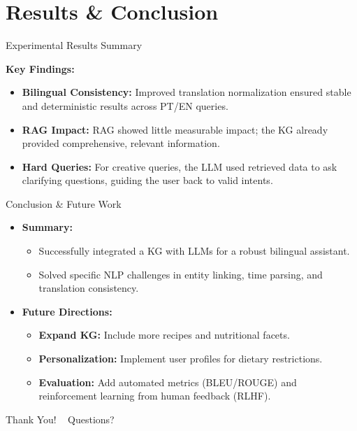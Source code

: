 \documentclass[t, 10pt, handout, aspectratio=169]{beamer}
\begin{document}
\section{Results \& Conclusion}
\begin{frame}{Experimental Results Summary}

  \vspace{1em}
  \textbf{Key Findings:}
  \begin{itemize}
    \item \textbf{Bilingual Consistency:} Improved translation normalization ensured stable and deterministic results across PT/EN queries.
    \item \textbf{RAG Impact:} RAG showed little measurable impact; the KG already provided comprehensive, relevant information.
    \item \textbf{Hard Queries:} For creative queries, the LLM used retrieved data to ask clarifying questions, guiding the user back to valid intents.
  \end{itemize}
\end{frame}

\begin{frame}{Conclusion \& Future Work}
  \begin{itemize}
    \item \textbf{Summary:}
      \begin{itemize}
        \item Successfully integrated a KG with LLMs for a robust bilingual assistant.
        \item Solved specific NLP challenges in entity linking, time parsing, and translation consistency.
      \end{itemize}
    
    \vspace{1em}
    \item \textbf{Future Directions:}
      \begin{itemize}
        \item \textbf{Expand KG:} Include more recipes and nutritional facets.
        \item \textbf{Personalization:} Implement user profiles for dietary restrictions.
        \item \textbf{Evaluation:} Add automated metrics (BLEU/ROUGE) and reinforcement learning from human feedback (RLHF).
      \end{itemize}
  \end{itemize}
\end{frame}

\begin{frame}[plain]

\centering
\Huge \textcolor{structure.fg}{Thank You!} \
\vspace{1em}
\large Questions?
\end{frame}
\end{document}

